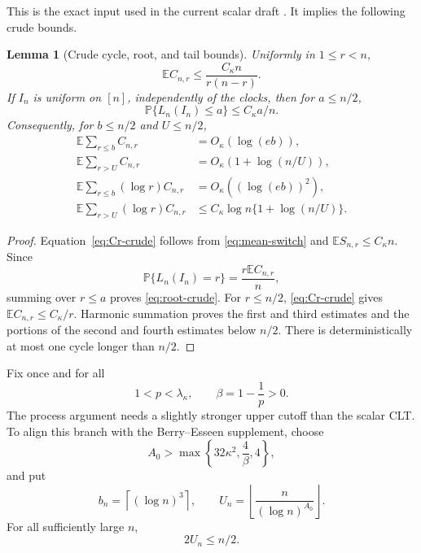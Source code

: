 \documentclass[11pt]{article}
\newtheorem{lemma}[theorem]{Lemma}
\theoremstyle{definition}
\theoremstyle{remark}
\newcommand{\Pp}{\mathbb P}
\newcommand{\Ee}{\mathbb E}
\begin{document}
This is the exact input used in the current scalar draft
\cite{LongOrder2026}.  It implies the following crude bounds.

\begin{lemma}[Crude cycle, root, and tail bounds]
\label{lem:crude}
Uniformly in $1\le r<n$,
\begin{equation}\label{eq:Cr-crude}
 \Ee C_{n,r}\le \frac{C_\kappa n}{r(n-r)}.
\end{equation}
If $I_n$ is uniform on $[n]$, independently of the clocks, then for
$a\le n/2$,
\begin{equation}\label{eq:root-crude}
 \Pp\{L_n(I_n)\le a\}\le C_\kappa a/n.
\end{equation}
Consequently, for $b\le n/2$ and $U\le n/2$,
\begin{align}
 \Ee\sum_{r\le b}C_{n,r}&=O_\kappa(\log(eb)),
 \label{eq:small-count-tail}\\
 \Ee\sum_{r>U}C_{n,r}&=O_\kappa(1+\log(n/U)),
 \label{eq:large-count-tail}\\
 \Ee\sum_{r\le b}(\log r)C_{n,r}
 &=O_\kappa((\log(eb))^2),
 \label{eq:small-weight-tail}\\
 \Ee\sum_{r>U}(\log r)C_{n,r}
 &\le C_\kappa\log n\{1+\log(n/U)\}.
 \label{eq:large-weight-tail}
\end{align}
\end{lemma}

\begin{proof}
Equation~\eqref{eq:Cr-crude} follows from
\eqref{eq:mean-switch} and $\Ee S_{n,r}\le C_\kappa n$.  Since
\[
 \Pp\{L_n(I_n)=r\}=\frac{r\Ee C_{n,r}}n,
\]
summing over $r\le a$ proves \eqref{eq:root-crude}.  For $r\le n/2$,
\eqref{eq:Cr-crude} gives $\Ee C_{n,r}\le C_\kappa/r$.  Harmonic summation
proves the first and third estimates and the portions of the second and
fourth estimates below $n/2$.  There is deterministically at most one cycle
longer than $n/2$.
\end{proof}

Fix once and for all
\begin{equation}\label{eq:p-beta}
 1<p<\lambda_\kappa,
 \qquad
 \beta=1-\frac1p>0.
\end{equation}
The process argument needs a slightly stronger upper cutoff than the scalar
CLT.  To align this branch with the Berry--Esseen supplement, choose
\begin{equation}\label{eq:A0-choice}
 A_0>\max\left\{32\kappa^2,\frac4\beta,4\right\},
\end{equation}
and put
\begin{equation}\label{eq:cutoffs}
 b_n=\left\lceil(\log n)^3\right\rceil,
 \qquad
 U_n=\left\lfloor\frac{n}{(\log n)^{A_0}}\right\rfloor.
\end{equation}
For all sufficiently large $n$,
\begin{equation}\label{eq:cutoff-range}
 2U_n\le n/2.
\end{equation}
\end{document}
